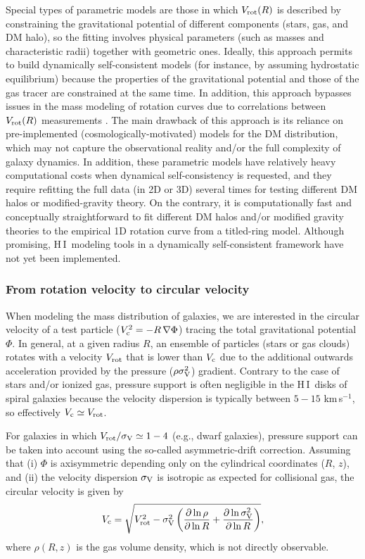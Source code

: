 \documentclass[a4paper,11pt]{article}
\newcommand{\hi } {{\rm H}\,{\small\rm I}}
\begin{document}
Special types of parametric models are those in which $V_{\rm rot}(R)$ is described by constraining the gravitational potential of different components (stars, gas, and DM halo), so the fitting involves physical parameters (such as masses and characteristic radii) together with geometric ones. Ideally, this approach permits to build dynamically self-consistent models (for instance, by assuming hydrostatic equilibrium) because the properties of the gravitational potential and those of the gas tracer are constrained at the same time. In addition, this approach bypasses issues in the mass modeling of rotation curves due to correlations between $V_{\rm rot}(R)$ measurements \citep{Posti22}.
The main drawback of this approach is its reliance on pre-implemented (cosmologically-motivated) models for the DM distribution, which may not capture the observational reality and/or the full complexity of galaxy dynamics. In addition, these parametric models have relatively heavy computational costs when dynamical self-consistency is requested, and they require refitting the full data (in 2D or 3D) several times for testing different DM halos or modified-gravity theory. On the contrary, it is computationally fast and conceptually straightforward to fit different DM halos and/or modified gravity theories to the empirical 1D rotation curve from a titled-ring model. Although promising, \hi\ modeling tools in a dynamically self-consistent framework have not yet been implemented.

\subsubsection{From rotation velocity to circular velocity}\label{sec:pressure}

When modeling the mass distribution of galaxies, we are interested in the circular velocity of a test particle ($V_{\rm c}^2 = -R\,\nabla \Phi$) tracing the total gravitational potential $\Phi$. In general, at a given radius $R$, an ensemble of particles (stars or gas clouds) rotates with a velocity $V_{\rm rot}$ that is lower than $V_{\rm c}$ due to the additional outwards acceleration provided by the pressure ($\rho \sigma_{\rm V}^2$) gradient. Contrary to the case of stars and/or ionized gas, pressure support is often negligible in the \hi\ disks of spiral galaxies because the velocity dispersion is typically between $5-15$ km\,s$^{-1}$, so effectively $V_{\rm c} \simeq V_{\rm rot}$.

For galaxies in which $V_{\rm rot}/\sigma_{\rm V}\simeq1-4$ (e.g., dwarf galaxies), pressure support can be taken into account using the so-called asymmetric-drift correction. Assuming that (i) $\Phi$ is axisymmetric depending only on the cylindrical coordinates ($R$, $z$), and (ii) the velocity dispersion $\sigma_{\rm V}$ is isotropic as expected for collisional gas, the circular velocity is given by \citep{BT94}
\begin{equation}\label{eq:drift1}
V_{\rm c} = \sqrt{V_{\rm rot}^2 - \sigma_{\rm V}^2 \left( \dfrac{\partial \ln \rho}{\partial \ln R} + \dfrac{\partial \ln \sigma_{\rm V}^2}{\partial \ln R} \right)},
\end{equation}
where $\rho(R,z)$ is the gas volume density, which is not directly observable.
\end{document}
